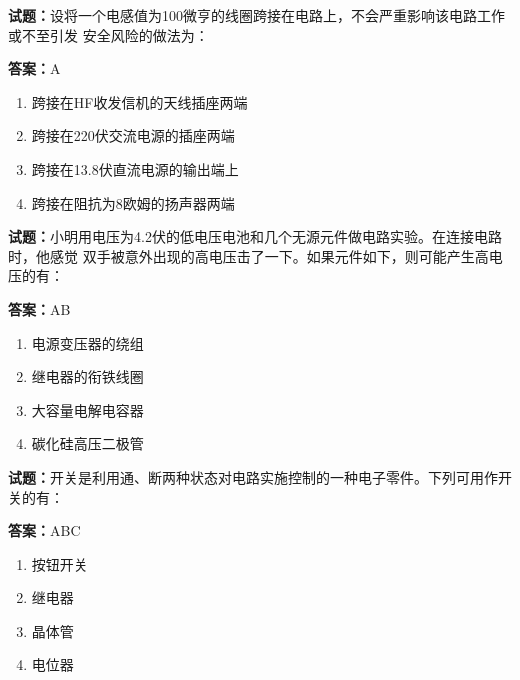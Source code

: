 \documentclass{ctexbook}
\begin{document}
\textbf{试题：}设将一个电感值为100微亨的线圈跨接在电路上，不会严重影响该电路工作或不至引发
安全风险的做法为： 

\textbf{答案：}A 

\begin{enumerate}[leftmargin=3em]
  \item 跨接在HF收发信机的天线插座两端 

  \item 跨接在220伏交流电源的插座两端 

  \item 跨接在13.8伏直流电源的输出端上 

  \item 跨接在阻抗为8欧姆的扬声器两端 

\end{enumerate}





\vspace{1em}

\textbf{试题：}小明用电压为4.2伏的低电压电池和几个无源元件做电路实验。在连接电路时，他感觉
双手被意外出现的高电压击了一下。如果元件如下，则可能产生高电压的有： 

\textbf{答案：}AB 

\begin{enumerate}[leftmargin=3em]
  \item 电源变压器的绕组 

  \item 继电器的衔铁线圈 

  \item 大容量电解电容器 

  \item 碳化硅高压二极管 

\end{enumerate}





\vspace{1em}

\textbf{试题：}开关是利用通、断两种状态对电路实施控制的一种电子零件。下列可用作开关的有： 


\textbf{答案：}ABC 

\begin{enumerate}[leftmargin=3em]
  \item 按钮开关 

  \item 继电器 

  \item 晶体管 

  \item 电位器 

\end{enumerate}
\end{document}
